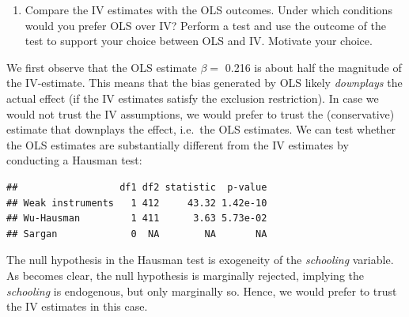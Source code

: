 \documentclass[
]{article}
\newenvironment{Shaded}{\begin{snugshade}}{\end{snugshade}}
\newcommand{\DataTypeTok}[1]{\textcolor[rgb]{0.13,0.29,0.53}{#1}}
\newcommand{\KeywordTok}[1]{\textcolor[rgb]{0.13,0.29,0.53}{\textbf{#1}}}
\newcommand{\NormalTok}[1]{#1}
\newcommand{\OperatorTok}[1]{\textcolor[rgb]{0.81,0.36,0.00}{\textbf{#1}}}
\newcommand{\OtherTok}[1]{\textcolor[rgb]{0.56,0.35,0.01}{#1}}
\newcommand{\StringTok}[1]{\textcolor[rgb]{0.31,0.60,0.02}{#1}}
\providecommand{\tightlist}{%
  \setlength{\itemsep}{0pt}\setlength{\parskip}{0pt}}
\begin{document}
\begin{enumerate}
\def\labelenumi{(\alph{enumi})}
\setcounter{enumi}{2}
\tightlist
\item
  Compare the IV estimates with the OLS outcomes. Under which conditions
  would you prefer OLS over IV? Perform a test and use the outcome of
  the test to support your choice between OLS and IV. Motivate your
  choice.
\end{enumerate}

We first observe that the OLS estimate \(\beta =\) 0.216 is about half
the magnitude of the IV-estimate. This means that the bias generated by
OLS likely \emph{downplays} the actual effect (if the IV estimates
satisfy the exclusion restriction). In case we would not trust the IV
assumptions, we would prefer to trust the (conservative) estimate that
downplays the effect, i.e.~the OLS estimates. We can test whether the
OLS estimates are substantially different from the IV estimates by
conducting a Hausman test:

\begin{Shaded}
\end{Shaded}

\begin{verbatim}
##                  df1 df2 statistic  p-value
## Weak instruments   1 412     43.32 1.42e-10
## Wu-Hausman         1 411      3.63 5.73e-02
## Sargan             0  NA        NA       NA
\end{verbatim}

The null hypothesis in the Hausman test is exogeneity of the
\emph{schooling} variable. As becomes clear, the null hypothesis is
marginally rejected, implying the \emph{schooling} is endogenous, but
only marginally so. Hence, we would prefer to trust the IV estimates in
this case.
\end{document}
